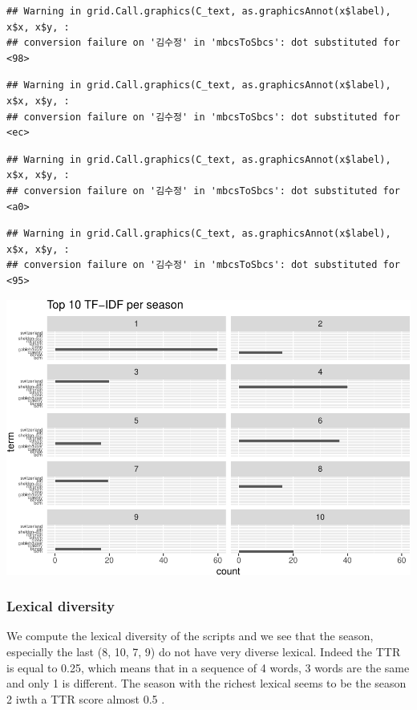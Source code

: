 \documentclass[
]{article}
\begin{document}
\begin{verbatim}
## Warning in grid.Call.graphics(C_text, as.graphicsAnnot(x$label), x$x, x$y, :
## conversion failure on '김수정' in 'mbcsToSbcs': dot substituted for <98>
\end{verbatim}

\begin{verbatim}
## Warning in grid.Call.graphics(C_text, as.graphicsAnnot(x$label), x$x, x$y, :
## conversion failure on '김수정' in 'mbcsToSbcs': dot substituted for <ec>
\end{verbatim}

\begin{verbatim}
## Warning in grid.Call.graphics(C_text, as.graphicsAnnot(x$label), x$x, x$y, :
## conversion failure on '김수정' in 'mbcsToSbcs': dot substituted for <a0>
\end{verbatim}

\begin{verbatim}
## Warning in grid.Call.graphics(C_text, as.graphicsAnnot(x$label), x$x, x$y, :
## conversion failure on '김수정' in 'mbcsToSbcs': dot substituted for <95>
\end{verbatim}

\includegraphics{report_files/figure-latex/unnamed-chunk-18-1.pdf}

\hypertarget{lexical-diversity}{%
\subsubsection{Lexical diversity}\label{lexical-diversity}}

We compute the lexical diversity of the scripts and we see that the
season, especially the last (8, 10, 7, 9) do not have very diverse
lexical. Indeed the TTR is equal to 0.25, which means that in a sequence
of 4 words, 3 words are the same and only 1 is different. The season
with the richest lexical seems to be the season 2 iwth a TTR score
almost 0.5 .
\end{document}
